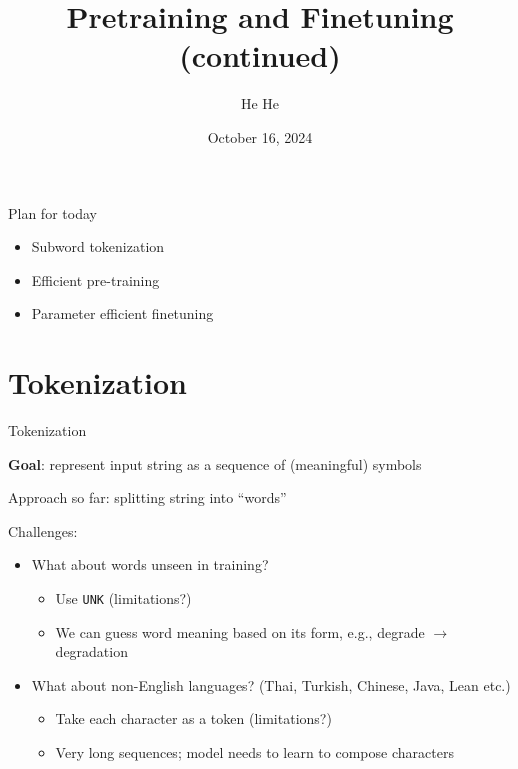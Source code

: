 \documentclass[usenames,dvipsnames,notes,11pt,aspectratio=169,hyperref={colorlinks=true, linkcolor=blue}]{beamer}
\title[DS-GA.1011]{Pretraining and Finetuning (continued)}
\author[He He]{He He
}
\institute[NYU]{
    \texttt{[image: ../figures/nyu-logo]}\\
}
\date{October 16, 2024}
\begin{document}
\begin{frame}
\titlepage
\end{frame}

\begin{frame}
    {Plan for today}

    \begin{itemize}
        \item Subword tokenization 
        \item Efficient pre-training
        \item Parameter efficient finetuning 
    \end{itemize}

\end{frame}

\section{Tokenization}

\begin{frame}
    {Tokenization}

    {\bf Goal}: represent input string as a sequence of (meaningful) symbols

    \medskip
    Approach so far: splitting string into ``words''

    \pause\medskip
    Challenges:\\
    \begin{itemize}
        \item What about words unseen in training?
            \begin{itemize}
                \item Use {\tt UNK} (limitations?) \pause
                \item We can guess word meaning based on its form, e.g., degrade $\to$ degradation 
            \end{itemize}
        \pause
        \item What about non-English languages? (Thai, Turkish, Chinese, Java, Lean etc.) 
            \begin{itemize}
                \item Take each character as a token (limitations?) \pause
                \item Very long sequences; model needs to learn to compose characters
            \end{itemize}
    \end{itemize}
\end{frame}
\end{document}
